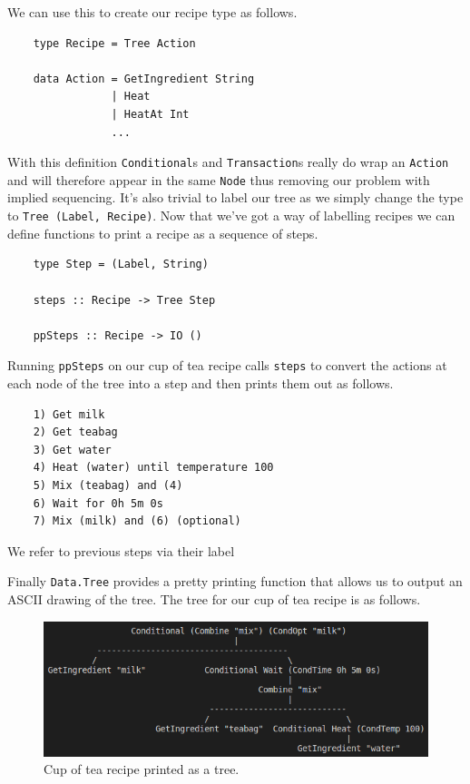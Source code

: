 \documentclass[11pt]{article}
\begin{document}
We can use this to create our recipe type as follows.

\begin{lstlisting}
    type Recipe = Tree Action

    data Action = GetIngredient String
                | Heat
                | HeatAt Int
                ...
\end{lstlisting}

With this definition \texttt{Conditional}s and \texttt{Transaction}s really do wrap an
\texttt{Action} and will therefore appear in the same \texttt{Node} thus removing our
problem with implied sequencing. It's also trivial to label our tree as we simply
change the type to \texttt{Tree (Label, Recipe)}. Now that we've got a way of
labelling recipes we can define functions to print a recipe as a sequence of steps.

\begin{lstlisting}
    type Step = (Label, String)

    steps :: Recipe -> Tree Step

    ppSteps :: Recipe -> IO ()
\end{lstlisting}

Running \texttt{ppSteps} on our cup of tea recipe calls \texttt{steps} to convert
the actions at each node of the tree into a step and then prints them out as follows.

\begin{lstlisting}
    1) Get milk
    2) Get teabag
    3) Get water
    4) Heat (water) until temperature 100
    5) Mix (teabag) and (4)
    6) Wait for 0h 5m 0s
    7) Mix (milk) and (6) (optional)
\end{lstlisting}

We refer to previous steps via their label

Finally \texttt{Data.Tree} provides a pretty printing function that allows us
to output an ASCII drawing of the tree. The tree for our cup of tea recipe is
as follows.

\begin{figure}[h]
\includegraphics[width=\textwidth, keepaspectratio]{cupOfTea.png}
\centering
\caption{Cup of tea recipe printed as a tree.}
\end{figure}
\end{document}
